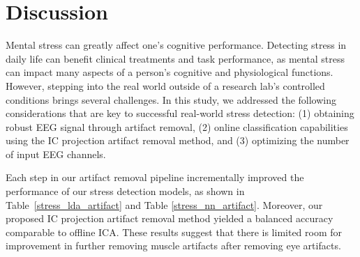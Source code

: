 \documentclass[journal]{IEEEtran}
\begin{document}
\section{Discussion}
Mental stress can greatly affect one's cognitive performance.
Detecting stress in daily life can benefit clinical treatments and task performance, as mental stress can impact many aspects of a person's cognitive and physiological functions.
However, stepping into the real world outside of a research lab's controlled conditions brings several challenges. 
In this study, we addressed the following considerations that are key to successful real-world stress detection: (1) obtaining robust EEG signal through artifact removal, (2) online classification capabilities using the IC projection artifact removal method, and (3) optimizing the number of input EEG channels.
\par
Each step in our artifact removal pipeline incrementally improved the performance of our stress detection models, as shown in Table~\ref{stress_lda_artifact} and Table \ref{stress_nn_artifact}.
Moreover, our proposed IC projection artifact removal method yielded a balanced accuracy comparable to offline ICA.
These results suggest that there is limited room for improvement in further removing muscle artifacts after removing eye artifacts.
\end{document}
